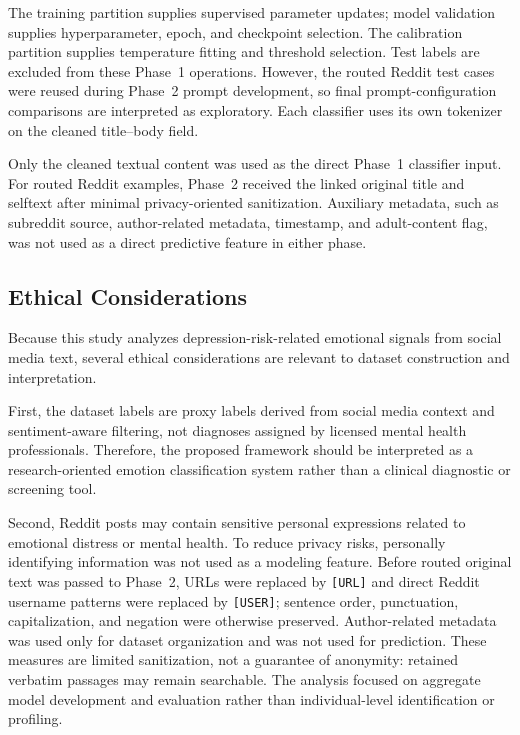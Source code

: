 \documentclass{ieeeaccess}
\begin{document}
The training partition supplies supervised parameter updates; model validation supplies hyperparameter, epoch, and checkpoint selection. The calibration partition supplies temperature fitting and threshold selection. Test labels are excluded from these Phase~1 operations. However, the routed Reddit test cases were reused during Phase~2 prompt development, so final prompt-configuration comparisons are interpreted as exploratory. Each classifier uses its own tokenizer on the cleaned title--body field.

Only the cleaned textual content was used as the direct Phase~1 classifier input. For routed Reddit examples, Phase~2 received the linked original title and selftext after minimal privacy-oriented sanitization. Auxiliary metadata, such as subreddit source, author-related metadata, timestamp, and adult-content flag, was not used as a direct predictive feature in either phase.

\subsection{Ethical Considerations}

Because this study analyzes depression-risk-related emotional signals from social media text, several ethical considerations are relevant to dataset construction and interpretation.

First, the dataset labels are proxy labels derived from social media context and sentiment-aware filtering, not diagnoses assigned by licensed mental health professionals. Therefore, the proposed framework should be interpreted as a research-oriented emotion classification system rather than a clinical diagnostic or screening tool.

Second, Reddit posts may contain sensitive personal expressions related to emotional distress or mental health. To reduce privacy risks, personally identifying information was not used as a modeling feature. Before routed original text was passed to Phase~2, URLs were replaced by \texttt{[URL]} and direct Reddit username patterns were replaced by \texttt{[USER]}; sentence order, punctuation, capitalization, and negation were otherwise preserved. Author-related metadata was used only for dataset organization and was not used for prediction. These measures are limited sanitization, not a guarantee of anonymity: retained verbatim passages may remain searchable. The analysis focused on aggregate model development and evaluation rather than individual-level identification or profiling.
\end{document}
